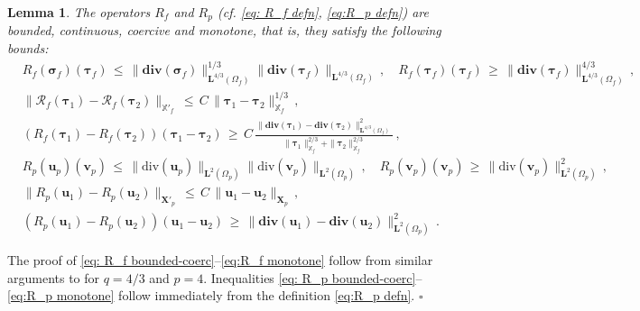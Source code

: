 \documentclass[11pt]{article}
\numberwithin{equation}{section}
\newcommand{\ds}{\displaystyle}
\newcommand{\bsi}{{\boldsymbol\sigma}}
\newcommand{\btau}{{\boldsymbol\tau}}
\newcommand{\bv}{{\mathbf{v}}}
\newcommand{\bu}{\mathbf{u}}
\newcommand{\0}{{\mathbf{0}}}
\def\bX{\mathbf{X}}
\newcommand{\bL}{\mathbf{L}}
\newcommand\bbX{\mathbb{X}}
\newcommand{\cR}{\mathcal{R}}
\def\bdiv{\mathbf{div}}
\def\div{\mathrm{div}}
\newtheorem{lem}[thm]{Lemma}
\newenvironment{proof}{\noindent{\it Proof.}}{\hfill$\square$}
\numberwithin{equation}{section}
\begin{document}
\begin{lem}\label{lem:Rf-Rp-properties}
The operators $R_f$ and $R_p$ (cf. \eqref{eq: R_f defn}, \eqref{eq:R_p defn}) are bounded, continuous, coercive and monotone, that is, they satisfy the following bounds:
\begin{subequations}\label{eq:R_f R_p bounded-coerc-cont-monotone}
\begin{align}
& \ds R_f(\bsi_f)(\btau_f) \,\leq\, \|\bdiv(\bsi_f)\|^{1/3}_{\bL^{4/3}(\Omega_f)} \|\bdiv(\btau_f)\|_{\bL^{4/3}(\Omega_f)}\,, 
\quad  R_f(\btau_f)(\btau_f) \,\geq\, \|\bdiv(\btau_f)\|^{4/3}_{\bL^{4/3}(\Omega_f)}\,, \label{eq: R_f bounded-coerc} \\[1ex] 
& \ds \|\cR_f(\btau_1) - \cR_f(\btau_2)\|_{\bbX'_f} 
\,\leq\, C\,\|\btau_1 - \btau_2\|^{1/3}_{\bbX_f}\,, \label{eq:R_f cont} \\[1ex]
& \ds (R_f(\btau_1) - R_f(\btau_2))(\btau_1 - \btau_2)
\,\geq\, C\,\frac{\|\bdiv(\btau_1) - \bdiv(\btau_2)\|^2_{\bL^{4/3}(\Omega_f)}}{\|\btau_1\|^{2/3}_{\bbX_f} + \|\btau_2\|^{2/3}_{\bbX_f}}\,, \label{eq:R_f monotone} \\[1ex]
& \ds R_p(\bu_p)(\bv_p) \,\leq\, \|\div(\bu_p)\|_{\bL^2(\Omega_p)} \|\div(\bv_p)\|_{\bL^2(\Omega_p)}\,, 
\quad  R_p(\bv_p)(\bv_p) \,\geq\, \|\div(\bv_p)\|^2_{\bL^2(\Omega_p)}\,, \label{eq: R_p bounded-coerc} \\[1ex]
& \ds \|R_p(\bu_1) - R_p(\bu_2)\|_{\bX'_p} 
\,\leq\, C\,\|\bu_1 - \bu_2\|_{\bX_p}\,, \label{eq:R_p cont} \\[1ex]
& \ds (R_p(\bu_1) - R_p(\bu_2))(\bu_1 - \bu_2)
\,\geq\, \|\bdiv(\bu_1) - \bdiv(\bu_2)\|^2_{\bL^{2}(\Omega_p)}\,. \label{eq:R_p monotone}
\end{align}
\end{subequations}
\end{lem}
%
\begin{proof}
The proof of \eqref{eq: R_f bounded-coerc}--\eqref{eq:R_f monotone} follow from similar arguments to \cite[Lemma 3.4]{cy2021} for $q=4/3$ and $p=4$. 
Inequalities \eqref{eq: R_p bounded-coerc}--\eqref{eq:R_p monotone} follow immediately from the definition \eqref{eq:R_p defn}.
\end{proof}
\end{document}
